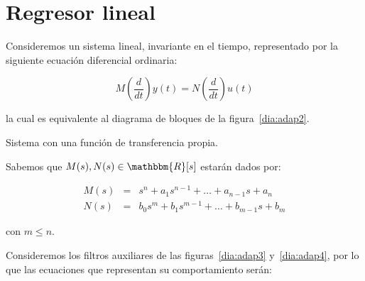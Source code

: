     \section{Regresor lineal}

        Consideremos un sistema lineal, invariante en el tiempo, representado por la siguiente ecuación diferencial ordinaria:

        \begin{equation} \label{eq:adap1}
            M \left( \frac{d}{dt} \right) y(t) = N \left( \frac{d}{dt} \right) u(t)
        \end{equation}

        la cual es equivalente al diagrama de bloques de la figura~\ref{dia:adap2}.

        \begin{marginfigure}
            \centering
            \caption{\label{dia:adap2}Sistema con una función de transferencia propia.}
        \end{marginfigure}

        Sabemos que $M(s), N(s) \in \mathbbm{R}[s]$ estarán dados por:

        \begin{eqnarray} \label{eq:adap2}
            M(s) & = & s^n + a_1 s^{n-1} + \dots + a_{n-1} s + a_n \nonumber \\
            N(s) & = & b_0 s^m + b_1 s^{m-1} + \dots + b_{m-1} s + b_m
        \end{eqnarray}

        con $m \le n$.

        Consideremos los filtros auxiliares de las figuras~\ref{dia:adap3} y~\ref{dia:adap4}, por lo que las ecuaciones que representan su comportamiento serán:


